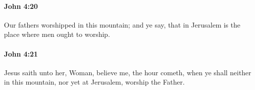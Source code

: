 		\paragraph{John 4:20} %
			\label{JOHN-4-20}

			Our fathers worshipped in this mountain; and ye say, that in Jerusalem is the place where men ought to worship.

			\begin{framed}
			\scriptsize
				\begin{compactdesc}
					\item[SBLG] 
				\end{compactdesc}
			\end{framed}

		\paragraph{John 4:21} %
			\label{JOHN-4-21}

			Jesus saith unto her, Woman, believe me, the hour cometh, when ye shall neither in this mountain, nor yet at Jerusalem, worship the Father.

